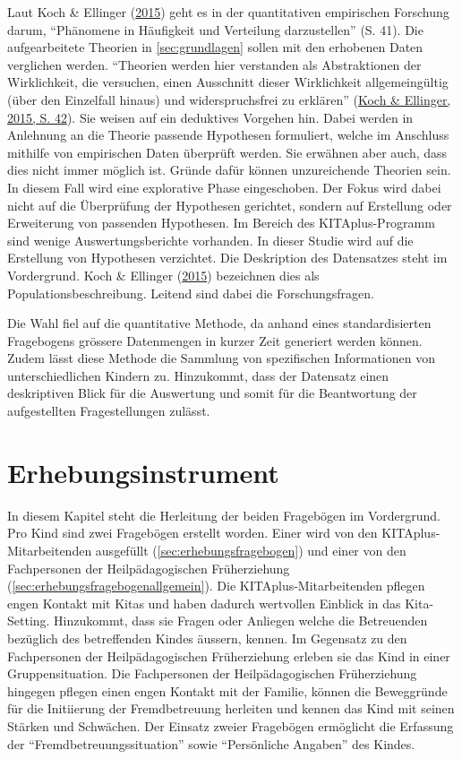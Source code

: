\documentclass[
  ngerman,
  11pt,
  paper=a4,
  twoside,
  titlepage=true,
  openright,
  abstract=on,
  toc=listofnumbered,
  numbers=noenddot,
  chapterprefix=true,
  headings=optiontohead,
  svgnames,
  dvipsnames]{scrreprt}
\begin{document}
Laut Koch \& Ellinger (\protect\hyperlink{ref-Koch2015}{2015}) geht es
in der quantitativen empirischen Forschung darum, “Phänomene in
Häufigkeit und Verteilung darzustellen” (S. 41). Die aufgearbeitete
Theorien in \cref{sec:grundlagen} sollen mit den erhobenen Daten
verglichen werden. “Theorien werden hier verstanden als Abstraktionen
der Wirklichkeit, die versuchen, einen Ausschnitt dieser Wirklichkeit
allgemeingültig (über den Einzelfall hinaus) und widerspruchsfrei zu
erklären” (\protect\hyperlink{ref-Koch2015}{Koch \& Ellinger, 2015, S.
42}). Sie weisen auf ein deduktives Vorgehen hin. Dabei werden in
Anlehnung an die Theorie passende Hypothesen formuliert, welche im
Anschluss mithilfe von empirischen Daten überprüft werden. Sie erwähnen
aber auch, dass dies nicht immer möglich ist. Gründe dafür können
unzureichende Theorien sein. In diesem Fall wird eine explorative Phase
eingeschoben. Der Fokus wird dabei nicht auf die Überprüfung der
Hypothesen gerichtet, sondern auf Erstellung oder Erweiterung von
passenden Hypothesen. Im Bereich des KITAplus-Programm sind wenige
Auswertungsberichte vorhanden. In dieser Studie wird auf die Erstellung
von Hypothesen verzichtet. Die Deskription des Datensatzes steht im
Vordergrund. Koch \& Ellinger (\protect\hyperlink{ref-Koch2015}{2015})
bezeichnen dies als Populationsbeschreibung. Leitend sind dabei die
Forschungsfragen.

Die Wahl fiel auf die quantitative Methode, da anhand eines
standardisierten Fragebogens grössere Datenmengen in kurzer Zeit
generiert werden können. Zudem lässt diese Methode die Sammlung von
spezifischen Informationen von unterschiedlichen Kindern zu. Hinzukommt,
dass der Datensatz einen deskriptiven Blick für die Auswertung und somit
für die Beantwortung der aufgestellten Fragestellungen zulässt.

\hypertarget{sec:erhebungsinstrument}{%
\section{Erhebungsinstrument}\label{sec:erhebungsinstrument}}

In diesem Kapitel steht die Herleitung der beiden Fragebögen im
Vordergrund. Pro Kind sind zwei Fragebögen erstellt worden. Einer wird
von den KITAplus-Mitarbeitenden ausgefüllt
(\cref{sec:erhebungsfragebogen}) und einer von den Fachpersonen der
Heilpädagogischen Früherziehung
(\cref{sec:erhebungsfragebogenallgemein}). Die KITAplus-Mitarbeitenden
pflegen engen Kontakt mit Kitas und haben dadurch wertvollen Einblick in
das Kita-Setting. Hinzukommt, dass sie Fragen oder Anliegen welche die
Betreuenden bezüglich des betreffenden Kindes äussern, kennen. Im
Gegensatz zu den Fachpersonen der Heilpädagogischen Früherziehung
erleben sie das Kind in einer Gruppensituation. Die Fachpersonen der
Heilpädagogischen Früherziehung hingegen pflegen einen engen Kontakt mit
der Familie, können die Beweggründe für die Initiierung der
Fremdbetreuung herleiten und kennen das Kind mit seinen Stärken und
Schwächen. Der Einsatz zweier Fragebögen ermöglicht die Erfassung der
“Fremdbetreuungssituation” sowie “Persönliche Angaben” des Kindes.
\end{document}
